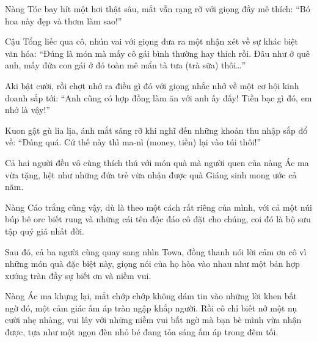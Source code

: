 \documentclass[../main.tex]{subfiles}
\begin{document}
Nàng Tóc bay hít một hơi thật sâu, mắt vẫn rạng rỡ với giọng đầy mê thích: ``Bó hoa này đẹp và thơm làm sao!''

Cậu Tổng liếc qua cô, nhún vai với giọng đưa ra một nhận xét về sự khác biệt văn hóa: ``Đúng là món mà mấy cô gái bình thường hay thích rồi. Đâu như ở quê anh, mấy đứa con gái ở đó toàn mê mẩn tà tưa (trà sữa) thôi\dots''

Aki bật cười, rồi chợt nhớ ra điều gì đó với giọng nhắc nhở về một cơ hội kinh doanh sắp tới: ``Anh cũng có hợp đồng làm ăn với anh ấy đấy! Tiền bạc gì đó, em nhớ là vậy!''

Kuon gật gù lia lịa, ánh mắt sáng rỡ khi nghĩ đến những khoản thu nhập sắp đổ về: ``Đúng quá. Cứ thế này thì ma-nì (money, tiền) lại vào túi thôi!''

Cả hai người đều vô cùng thích thú với món quà mà người quen của nàng Ác ma vừa tặng, hệt như những đứa trẻ vừa nhận được quà Giáng sinh mong ước cả năm.

Nàng Cáo trắng cũng vậy, dù là theo một cách rất riêng của mình, với cả một núi búp bê orc biết rung và những cái tên độc đáo cô đặt cho chúng, coi đó là bộ sưu tập quý giá nhất đời.


Sau đó, cả ba người cùng quay sang nhìn Towa, đồng thanh nói lời cảm ơn cô vì những món quà đặc biệt này, giọng nói của họ hòa vào nhau như một bản hợp xướng tràn đầy sự biết ơn và niềm vui.

Nàng Ác ma khựng lại, mắt chớp chớp không dám tin vào những lời khen bất ngờ đó, một cảm giác ấm áp tràn ngập khắp người. Rồi cô chỉ biết nở một nụ cười nhẹ nhàng, vui lây với những niềm vui bất ngờ mà bạn bè mình vừa nhận được, tựa như một ngọn đèn nhỏ bé đang tỏa sáng ấm áp trong đêm tối.
\end{document}
